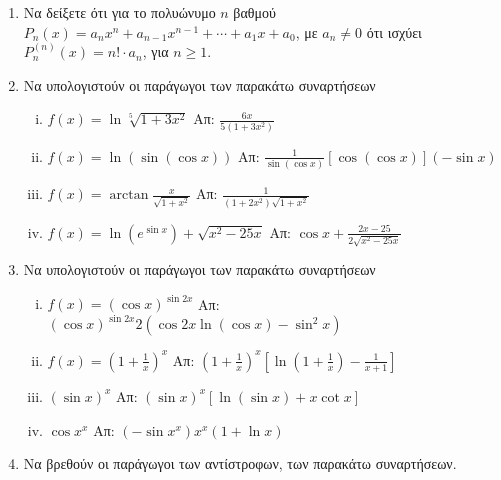 \begin{enumerate}
  \item Να δείξετε ότι για το πολυώνυμο $n$ βαθμού $ P_{n}(x) =a_{n}x^{n} +
    a_{n-1}x^{n-1} + \cdots + a_{1}x + a_{0} $, με  $ a_{n}\neq 0 $ ότι ισχύει $
    P_{n}^{(n)}(x) = n! \cdot a_{n}$, για  $n\geq 1 $.

  \item Να υπολογιστούν οι παράγωγοι των παρακάτω συναρτήσεων
    \begin{enumerate}[(i)]
      \item $ f(x) = \ln{\sqrt[5]{1+3x^{2}}} $ \hfill Απ: $
        \frac{6x}{5(1+3x^{2})} $
      \item $ f(x) = \ln({\sin({\cos{x}})}) $ \hfill Απ: $
        \frac{1}{\sin{(\cos{x})}} [\cos{(\cos{x})}] (- \sin{x}) $ 
      \item $ f(x) = \arctan \frac{x}{\sqrt{1 + x^{2}}} $ \hfill Απ: $
        \frac{1}{(1+2x^{2})\sqrt{1 + x^{2}}} $
      \item $ f(x) = \ln{(e^{\sin{x}})} + \sqrt{x^{2} - 25x} $ \hfill Απ: $
        \cos{x} + \frac{2x - 25}{2 \sqrt{x^{2} - 25x}}  $  
    \end{enumerate}

  \item  Να υπολογιστούν οι παράγωγοι των παρακάτω συναρτήσεων

    \begin{enumerate}[(i)]
      \item $ f(x) = (\cos{x})^{\sin{2x}} $ \hfill Απ: $
        (\cos{x})^{\sin{2x}} 2(\cos{2x} \ln{(\cos{x})} - \sin^{2}{x}) $
      \item $ f(x) = \left(1 + \frac{1}{x} \right)^{x} $ \hfill Απ: $
        \left(1 + \frac{1}{x}\right)^{x}\left[\ln{(1 + \frac{1}{x})} -
        \frac{1}{x+1}\right] $
      \item $ (\sin{x})^{x} $ \hfill Απ: $ (\sin{x})^{x}[\ln{(\sin{x}
        )} + x \cot{x}] $ 
      \item $ \cos{x}^{x} $ \hfill Απ: $ (- \sin{x^{x}})x^{x} (1 +
        \ln{x}) $
    \end{enumerate}

  \item Να βρεθούν οι παράγωγοι των αντίστροφων, των παρακάτω συναρτήσεων.
    \begin{enumerate}[(i)]
  \end{enumerate}


\end{enumerate}
